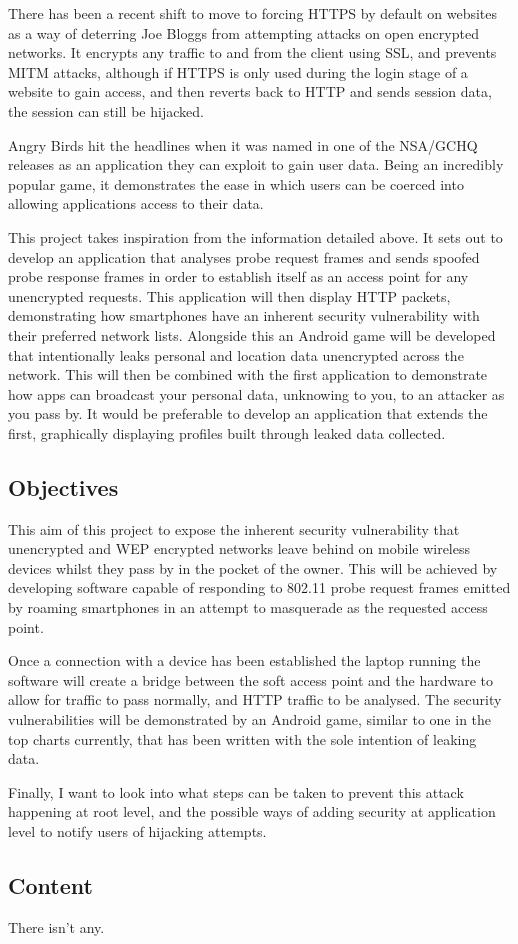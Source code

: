 There has been a recent shift to move to forcing HTTPS by default on websites as a way of deterring Joe Bloggs from attempting attacks on open encrypted networks. It encrypts any traffic to and from the client using SSL, and prevents MITM attacks, although if HTTPS is only used during the login stage of a website to gain access, and then reverts back to HTTP and sends session data, the session can still be hijacked.

Angry Birds hit the headlines when it was named in one of the NSA/GCHQ releases as an application they can exploit to gain user data. Being an incredibly popular game, it demonstrates the ease in which users can be coerced into allowing applications access to their data.

This project takes inspiration from the information detailed above. It sets out to develop an application that analyses probe request frames and sends spoofed probe response frames in order to establish itself as an access point for any unencrypted requests. This application will then display HTTP packets, demonstrating how smartphones have an inherent security vulnerability with their preferred network lists. Alongside this an Android game will be developed that intentionally leaks personal and location data unencrypted across the network. This will then be combined with the first application to demonstrate how apps can broadcast your personal data, unknowing to you, to an attacker as you pass by. It would be preferable to develop an application that extends the first, graphically displaying profiles built through leaked data collected.

\subsection{Objectives}
This aim of this project to expose the inherent security vulnerability that unencrypted and WEP encrypted networks leave behind on mobile wireless devices whilst they pass by in the pocket of the owner. This will be achieved by developing software capable of responding to 802.11 probe request frames emitted by roaming smartphones in an attempt to masquerade as the requested access point.

Once a connection with a device has been established the laptop running the software will create a bridge between the soft access point and the hardware to allow for traffic to pass normally, and HTTP traffic to be analysed. The security vulnerabilities will be demonstrated by an Android game, similar to one in the top charts currently, that has been written with the sole intention of leaking data. 

Finally, I want to look into what steps can be taken to prevent this attack happening at root level, and the possible ways of adding security at application level to notify users of hijacking attempts.

\subsection{Content}
There isn't any.
\clearpage